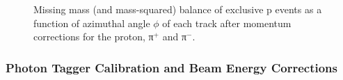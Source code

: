 \begin{figure}
\begin{center}
\begin{subfigure}{0.4\columnwidth}
\end{subfigure}
\caption[Momentum Balance Before Corrections]{\label{fig:mmbal}Missing mass (and mass-squared) balance of exclusive p \π[+] \π[-] events as a function of azimuthal angle $\phi$ of each track after momentum corrections for the proton, π$^+$ and π$^-$.}
\end{center}\end{figure}



\FloatBarrier


\subsubsection{Photon Tagger Calibration and Beam Energy Corrections}

